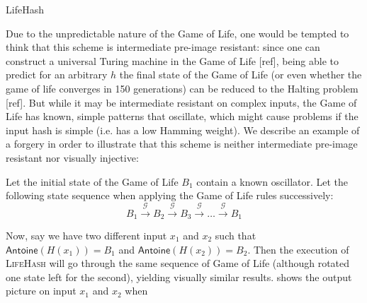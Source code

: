 \documentclass{article}
\newcommand{\bb}{\mathbb}
\newcommand{\prgb}{\bb P _\mathsf{RGB}}
\begin{document}
\begin{algorithm}
\DontPrintSemicolon
\SetAlgoNoEnd
{}
\KwResult{$F \in \prgb^{m_n}$}
\caption{LifeHash\label{algo:lifehash}}

\end{algorithm}


Due to the unpredictable nature of the Game of Life, one would be tempted to think that this scheme is intermediate pre-image resistant: since one can construct a universal Turing machine in the Game of Life [ref], being able to predict for an arbitrary $h$ the final state of the Game of Life (or even whether the game of life converges in 150 generations) can be reduced to the Halting problem [ref].
But while it may be intermediate resistant on complex inputs, the Game of Life has known, simple patterns that oscillate, which might cause problems if the input hash is simple (i.e. has a low Hamming weight). We describe an example of a forgery in order to illustrate that this scheme is neither intermediate pre-image resistant nor visually injective:

Let the initial state of the Game of Life $B_1$ contain a known oscillator. Let the following state sequence when applying the Game of Life rules successively: $$B_1 \xrightarrow{\mathcal G} B_2 \xrightarrow{\mathcal G}B_3 \xrightarrow{\mathcal G} \dots \xrightarrow{\mathcal{G}} B_1$$

Now, say we have two different input $x_1$ and $x_2$ such that $\mathsf{Antoine}(H(x_1)) = B_1$ and $\mathsf{Antoine}(H(x_2)) = B_2$. Then the execution of \textsc{LifeHash} will go through the same sequence of Game of Life (although rotated one state left for the second), yielding visually similar results.  shows the output picture on input $x_1$ and $x_2$ when 
\end{document}
